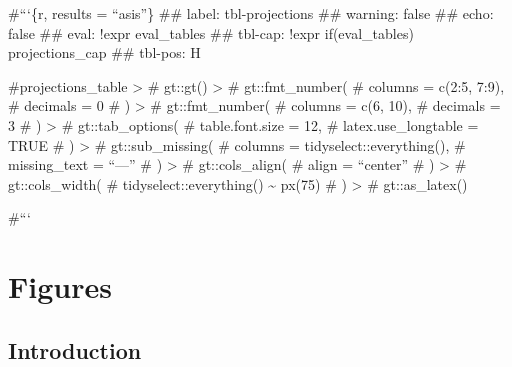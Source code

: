 \documentclass[
]{scrartcl}
\begin{document}
\endgroup{}

\pagebreak

\#```\{r, results = ``asis''\} \#\#\textbar{} label: tbl-projections
\#\#\textbar{} warning: false \#\#\textbar{} echo: false \#\#\textbar{}
eval: !expr eval\_tables \#\#\textbar{} tbl-cap: !expr if(eval\_tables)
projections\_cap \#\#\textbar{} tbl-pos: H

\#projections\_table \textbar\textgreater{} \# gt::gt()
\textbar\textgreater{} \# gt::fmt\_number( \# columns = c(2:5, 7:9), \#
decimals = 0 \# ) \textbar\textgreater{} \# gt::fmt\_number( \# columns
= c(6, 10), \# decimals = 3 \# ) \textbar\textgreater{} \#
gt::tab\_options( \# table.font.size = 12, \# latex.use\_longtable =
TRUE \# ) \textbar\textgreater{} \# gt::sub\_missing( \# columns =
tidyselect::everything(), \# missing\_text = ``---'' \# )
\textbar\textgreater{} \# gt::cols\_align( \# align = ``center'' \# )
\textbar\textgreater{} \# gt::cols\_width( \# tidyselect::everything()
\textasciitilde{} px(75) \# ) \textbar\textgreater{} \# gt::as\_latex()

\#```

\pagebreak

\newpage{}

\section{Figures}\label{figures}

\subsection{Introduction}\label{introduction-1}
\end{document}
